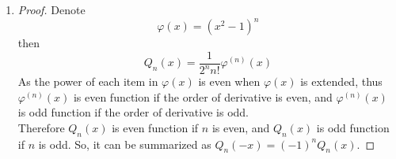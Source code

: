 \documentclass[paper=a4, fontsize=11pt]{scrartcl} %
\numberwithin{equation}{section} %
\numberwithin{figure}{section} %
\numberwithin{table}{section} %
\begin{document}
\begin{enumerate}
\begin{proof}
\begin{enumerate}
					\item
						If $h(x) = Q_n(x)$, then the $n-th$ derivative of $g(x)$ is
						\begin{equation}
							h^{(n)}(x) = Q^{(n)}(x) = \frac{(2n)!}{2^n n!}
						\end{equation} 
						Thus
						\begin{equation}
							\begin{aligned}
								\int_{-1}^{1}Q_n(x)Q_m(x)dx	
								& = \int_{-1}^{1}Q_n^2(x)dx  \ \ (\text{$n = m$}) \\
								& = \frac{(-1)^n (2n)!}{2^{2n}(n!)^2}\int_{-1}^{1}(x^2-1)^n dx\\
								& = \frac{(2n)!}{2^{2n}(n!)^2}\int_{-1}^{1}(1-x^2)^n dx\\
								& = \frac{(2n)!}{2^{2n}(n!)^2} \int_{0}^{\pi/2} cos^{2n+1}t dt\\
								& = \frac{(2n)!}{2^{2n}(n!)^2} \frac{2 \times 4 \times ... \times (2n)}{1\times3\times ... \times (2n+1)}\\
								& = \frac{2}{2n+1}
							\end{aligned}
						\end{equation}
				\end{enumerate}
				
				Thus, $(Q_n)_{n\in\mathbb{N}}$ are a sequence of orthogonal polynomials.
			\end{proof}
		
		\item
			\begin{proof}
				Denote
				\begin{equation}
				\varphi(x) = (x^2-1)^n
				\end{equation}
				then
				\begin{equation}
				Q_n(x) = \frac{1}{2^n n!}\varphi^{(n)}(x)
				\end{equation}
				As the power of each item in $\varphi(x)$ is even when $\varphi(x)$ is extended, thus $\varphi^{(n)}(x)$ is even function if the order of derivative is even, and $\varphi^{(n)}(x)$ is odd function if the order of derivative is odd. \\
				Therefore $Q_n(x)$ is even function if $n$ is even, and $Q_n(x)$ is odd function if $n$ is odd. So, it can be summarized as $Q_n(-x) = (-1)^n Q_n(x)$. 
			\end{proof}
		

\end{enumerate}
\end{document}
